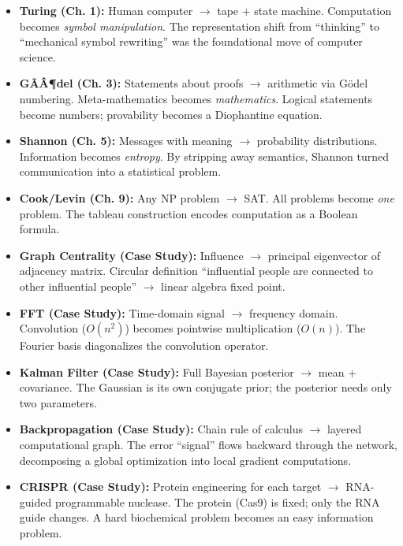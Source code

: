 \begin{itemize}
\item \textbf{Turing (Ch. 1):} Human computer $\to$ tape + state machine. Computation becomes \emph{symbol manipulation}. The representation shift from ``thinking'' to ``mechanical symbol rewriting'' was the foundational move of computer science.

\item \textbf{GÃÂ¶del (Ch. 3):} Statements about proofs $\to$ arithmetic via G\"odel numbering. Meta-mathematics becomes \emph{mathematics}. Logical statements become numbers; provability becomes a Diophantine equation.

\item \textbf{Shannon (Ch. 5):} Messages with meaning $\to$ probability distributions. Information becomes \emph{entropy}. By stripping away semantics, Shannon turned communication into a statistical problem.

\item \textbf{Cook/Levin (Ch. 9):} Any NP problem $\to$ SAT. All problems become \emph{one} problem. The tableau construction encodes computation as a Boolean formula.

\item \textbf{Graph Centrality (Case Study):} Influence $\to$ principal eigenvector of adjacency matrix. Circular definition ``influential people are connected to other influential people'' $\to$ linear algebra fixed point.

\item \textbf{FFT (Case Study):} Time-domain signal $\to$ frequency domain. Convolution ($O(n^2)$) becomes pointwise multiplication ($O(n)$). The Fourier basis diagonalizes the convolution operator.

\item \textbf{Kalman Filter (Case Study):} Full Bayesian posterior $\to$ mean + covariance. The Gaussian is its own conjugate prior; the posterior needs only two parameters.

\item \textbf{Backpropagation (Case Study):} Chain rule of calculus $\to$ layered computational graph. The error ``signal'' flows backward through the network, decomposing a global optimization into local gradient computations.

\item \textbf{CRISPR (Case Study):} Protein engineering for each target $\to$ RNA-guided programmable nuclease. The protein (Cas9) is fixed; only the RNA guide changes. A hard biochemical problem becomes an easy information problem.


\end{itemize}
